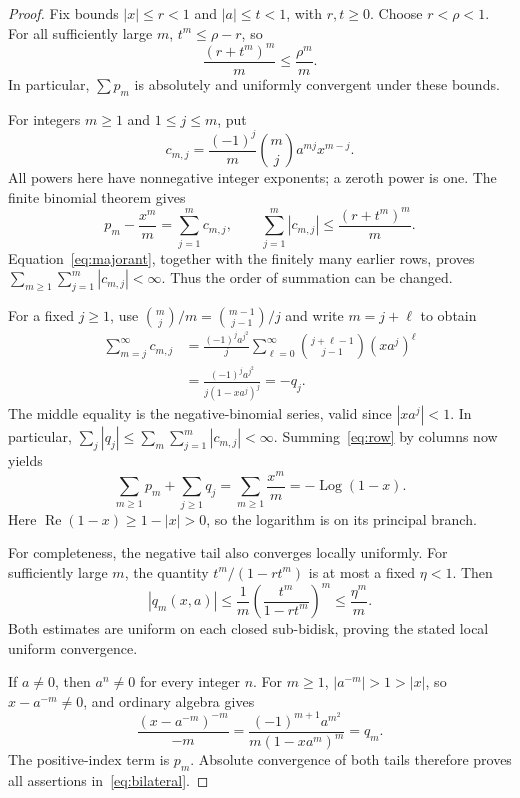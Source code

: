 \documentclass[11pt]{article}
\DeclareMathOperator{\Log}{Log}
\begin{document}
\begin{proof}
Fix bounds $|x|\leq r<1$ and $|a|\leq t<1$, with $r,t\geq0$.
Choose $r<\rho<1$. For all sufficiently large $m$, $t^m\leq\rho-r$,
so
\begin{equation}\label{eq:majorant}
 \frac{(r+t^m)^m}{m}\leq\frac{\rho^m}{m}.
\end{equation}
In particular, $\sum p_m$ is absolutely and uniformly convergent
under these bounds.

For integers $m\geq1$ and $1\leq j\leq m$, put
\[
 c_{m,j}=\frac{(-1)^j}{m}\binom mj a^{mj}x^{m-j}.
\]
All powers here have nonnegative integer exponents; a zeroth power is one.
The finite binomial theorem gives
\begin{equation}\label{eq:row}
 p_m-\frac{x^m}{m}=\sum_{j=1}^m c_{m,j},\qquad
 \sum_{j=1}^m|c_{m,j}|
 \leq\frac{(r+t^m)^m}{m}.
\end{equation}
Equation~\eqref{eq:majorant}, together with the finitely many earlier
rows, proves $\sum_{m\geq1}\sum_{j=1}^m|c_{m,j}|<\infty$.
Thus the order of summation can be changed.

For a fixed $j\geq1$, use
$\binom mj/m=\binom{m-1}{j-1}/j$ and write $m=j+\ell$ to obtain
\begin{align*}
 \sum_{m=j}^\infty c_{m,j}
 &=\frac{(-1)^j a^{j^2}}{j}
   \sum_{\ell=0}^\infty\binom{j+\ell-1}{j-1}(xa^j)^\ell\\
 &=\frac{(-1)^j a^{j^2}}{j(1-xa^j)^j}
 =-q_j.
\end{align*}
The middle equality is the negative-binomial series, valid since
$|xa^j|<1$. In particular,
$\sum_j|q_j|\leq\sum_m\sum_{j=1}^m|c_{m,j}|<\infty$.
Summing~\eqref{eq:row} by columns now yields
\[
 \sum_{m\geq1}p_m+\sum_{j\geq1}q_j
 =\sum_{m\geq1}\frac{x^m}{m}=-\Log(1-x).
\]
Here $\operatorname{Re}(1-x)\geq1-|x|>0$, so the logarithm is on its
principal branch.

For completeness, the negative tail also converges locally uniformly.
For sufficiently large $m$, the quantity
$t^m/(1-rt^m)$ is at most a fixed $\eta<1$. Then
\[
 |q_m(x,a)|\leq\frac1m
 \left(\frac{t^m}{1-rt^m}\right)^m\leq\frac{\eta^m}{m}.
\]
Both estimates are uniform on each closed sub-bidisk, proving the stated
local uniform convergence.

If $a\ne0$, then $a^n\ne0$ for every integer $n$. For $m\geq1$,
$|a^{-m}|>1>|x|$, so $x-a^{-m}\ne0$, and ordinary algebra gives
\[
 \frac{(x-a^{-m})^{-m}}{-m}
 =\frac{(-1)^{m+1}a^{m^2}}{m(1-xa^m)^m}=q_m.
\]
The positive-index term is $p_m$. Absolute convergence of both tails
therefore proves all assertions in~\eqref{eq:bilateral}.
\end{proof}
\end{document}
